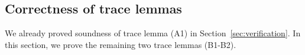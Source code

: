 
\subsection{Correctness of trace lemmas}
\label{sec:trace-lemmas}
We already proved soundness of trace lemma (A1) in
Section~\ref{sec:verification}.
In this section, we prove the remaining two trace lemmas (B1-B2).

